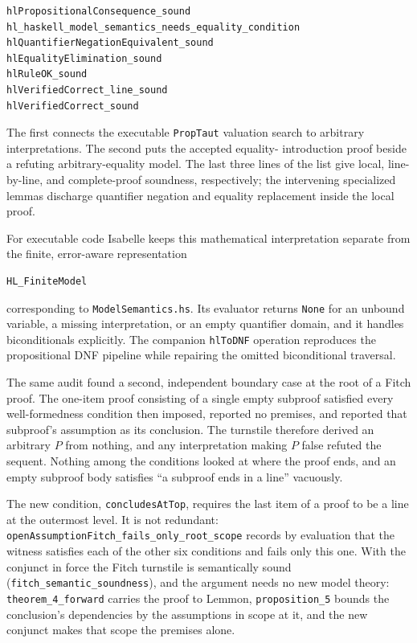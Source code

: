 \documentclass[11pt]{article}
\theoremstyle{plain}
\theoremstyle{definition}
\theoremstyle{remark}
\begin{document}
\begin{lstlisting}[language={}]
hlPropositionalConsequence_sound
hl_haskell_model_semantics_needs_equality_condition
hlQuantifierNegationEquivalent_sound
hlEqualityElimination_sound
hlRuleOK_sound
hlVerifiedCorrect_line_sound
hlVerifiedCorrect_sound
\end{lstlisting}

\noindent The first connects the executable \verb|PropTaut| valuation search
to arbitrary interpretations. The second puts the accepted equality-
introduction proof beside a refuting arbitrary-equality model. The last three
lines of the list give local, line-by-line, and complete-proof soundness,
respectively; the intervening specialized lemmas discharge quantifier
negation and equality replacement inside the local proof.

For executable code Isabelle keeps this mathematical interpretation separate
from the finite, error-aware representation

\begin{lstlisting}[language={}]
HL_FiniteModel
\end{lstlisting}

\noindent corresponding to \verb|ModelSemantics.hs|. Its evaluator returns
\verb|None| for an unbound
variable, a missing interpretation, or an empty quantifier domain, and it
handles biconditionals explicitly.  The companion \verb|hlToDNF| operation
reproduces the propositional DNF pipeline while repairing the omitted
biconditional traversal.

The same audit found a second, independent boundary case at the root of a
Fitch proof. The one-item proof consisting of a single empty subproof satisfied
every well-formedness condition then imposed, reported no premises, and
reported that subproof's assumption as its conclusion. The turnstile therefore
derived an arbitrary $P$ from nothing, and any interpretation making $P$ false
refuted the sequent. Nothing among the conditions looked at where the proof
ends, and an empty subproof body satisfies ``a subproof ends in a line''
vacuously.

The new condition, \verb|concludesAtTop|, requires the last item of a proof
to be a line at the
outermost level. It is not redundant:
\verb|openAssumptionFitch_fails_only_root_scope| records by evaluation that the
witness satisfies each of the other six conditions and fails only this one.
With the conjunct in force the Fitch turnstile is semantically sound
(\verb|fitch_semantic_soundness|), and the argument needs no new model theory:
\verb|theorem_4_forward| carries the proof to Lemmon, \verb|proposition_5|
bounds the conclusion's dependencies by the assumptions in scope at it, and the
new conjunct makes that scope the premises alone.
\end{document}

